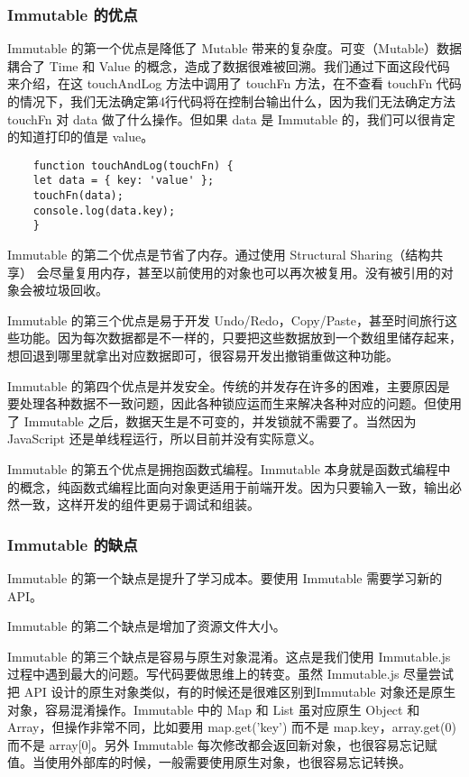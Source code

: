    \subsubsection{Immutable 的优点}

   Immutable 的第一个优点是降低了 Mutable 带来的复杂度。可变（Mutable）数据耦合了 Time 和 Value 的概念，造成了数据很难被回溯。我们通过下面这段代码来介绍，在这 touchAndLog 方法中调用了 touchFn 方法，在不查看 touchFn 代码的情况下，我们无法确定第4行代码将在控制台输出什么，因为我们无法确定方法 touchFn 对 data 做了什么操作。但如果 data 是 Immutable 的，我们可以很肯定的知道打印的值是 value。

   {\setmainfont{Courier New Bold}
   \begin{lstlisting}
    function touchAndLog(touchFn) {
    let data = { key: 'value' };
    touchFn(data);
    console.log(data.key);
    }
    \end{lstlisting}}

    Immutable 的第二个优点是节省了内存。通过使用 Structural Sharing（结构共享） 会尽量复用内存，甚至以前使用的对象也可以再次被复用。没有被引用的对象会被垃圾回收。

    Immutable 的第三个优点是易于开发 Undo/Redo，Copy/Paste，甚至时间旅行这些功能。因为每次数据都是不一样的，只要把这些数据放到一个数组里储存起来，想回退到哪里就拿出对应数据即可，很容易开发出撤销重做这种功能。

    Immutable 的第四个优点是并发安全。传统的并发存在许多的困难，主要原因是要处理各种数据不一致问题，因此各种锁应运而生来解决各种对应的问题。但使用了 Immutable 之后，数据天生是不可变的，并发锁就不需要了。当然因为 JavaScript 还是单线程运行，所以目前并没有实际意义。

    Immutable 的第五个优点是拥抱函数式编程。Immutable 本身就是函数式编程中的概念，纯函数式编程比面向对象更适用于前端开发。因为只要输入一致，输出必然一致，这样开发的组件更易于调试和组装。

    \subsubsection{Immutable 的缺点}
    Immutable 的第一个缺点是提升了学习成本。要使用 Immutable 需要学习新的 API。

    Immutable 的第二个缺点是增加了资源文件大小。

    Immutable 的第三个缺点是容易与原生对象混淆。这点是我们使用 Immutable.js 过程中遇到最大的问题。写代码要做思维上的转变。虽然 Immutable.js 尽量尝试把 API 设计的原生对象类似，有的时候还是很难区别到Immutable 对象还是原生对象，容易混淆操作。Immutable 中的 Map 和 List 虽对应原生 Object 和 Array，但操作非常不同，比如要用 map.get('key') 而不是 map.key，array.get(0) 而不是 array[0]。另外 Immutable 每次修改都会返回新对象，也很容易忘记赋值。当使用外部库的时候，一般需要使用原生对象，也很容易忘记转换。

